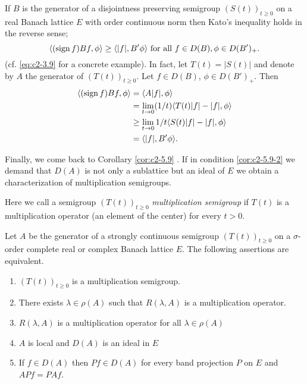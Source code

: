 \begin{remark}\label{rem:c2-5.12}
If $B$ is the generator of a disjointness preserving semigroup $(S(t))_{t \geq 0}$ on a real Banach lattice $E$ with order continuous norm then Kato's inequality holds in the reverse sense; \ie
\[
\langle(\operatorname{sign}  f)Bf,\phi \rangle \geq \langle |f|, B'\phi \rangle \text{ for all } f \in D(B), \phi \in D(B')_{+}.
\]
(cf. \eqref{eq:c2-3.9} for a concrete example). 
In fact, let $T(t) = |S(t)|$ and denote by $A$ the generator of $(T(t))_{t \geq 0}$. 
Let $f \in D(B)$, $\phi \in D(B')_{+}$.
Then 
\begin{align*}
\langle(\operatorname{sign}  f)Bf,\phi \rangle &= \langle A|f|,\phi \rangle \\
 &= \lim_{t \to 0} (1/t) \langle T(t)|f| - |f|, \phi \rangle \\
 &\geq \lim_{t \to 0} 1/t \langle S(t)|f| - |f|, \phi \rangle \\
 &= \langle |f|, B'\phi \rangle.
\end{align*}
\end{remark}

Finally, we come back to Corollary \ref{cor:c2-5.9}  .
If in condition \ref{cor:c2-5.9-2}   we demand that $D(A)$ is not only a sublattice but an ideal of $E$ we obtain a characterization of multiplication semigroups.

Here we call a semigroup $(T(t))_{t \geq 0}$ \emph{multiplication semigroup} if $T(t)$ is a multiplication operator (\ie an element of the center) for every $t > 0$.

\begin{theorem}\label{thm:c2-5.13}
Let $A$ be the generator of a strongly continuous semigroup $(T(t))_{t \geq 0}$ on a $\sigma$-order complete real or complex Banach lattice $E$.
The following assertions are equivalent.
\begin{enumerate}[\upshape (a)]
\item \label{thm:c2-5.13-1}
$(T(t))_{t \geq 0}$ is a multiplication semigroup.
\item \label{thm:c2-5.13-2}
There exists $\lambda \in \rho(A)$ such that $R(\lambda,A)$ is a multiplication operator.
\item \label{thm:c2-5.13-3}
$R(\lambda,A)$ is a multiplication operator for all $\lambda \in \rho(A)$
\item \label{thm:c2-5.13-4}
$A$ is local and $D(A)$ is an ideal in $E$
\item \label{thm:c2-5.13-5}
If $f \in D(A)$ then $Pf \in D(A)$ for every band projection $P$ on $E$ and $APf = PAf$.
\end{enumerate}
\end{theorem}

